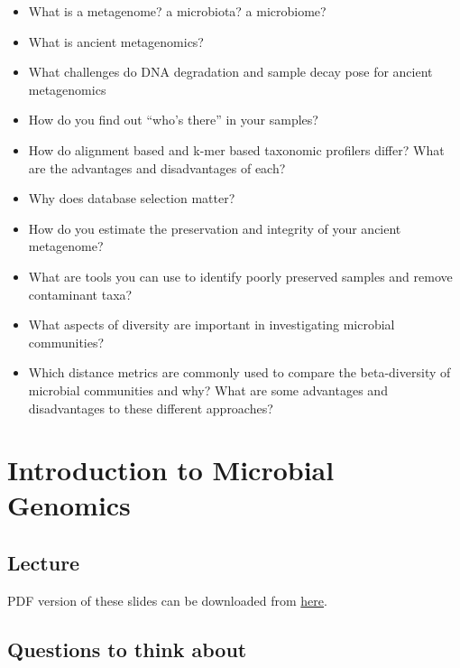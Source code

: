 \documentclass[
  letterpaper,
]{book}
\providecommand{\tightlist}{%
  \setlength{\itemsep}{0pt}\setlength{\parskip}{0pt}}\usepackage{longtable,booktabs,array}
\begin{document}
\begin{itemize}
\tightlist
\item
  What is a metagenome? a microbiota? a microbiome?
\item
  What is ancient metagenomics?
\item
  What challenges do DNA degradation and sample decay pose for ancient
  metagenomics
\item
  How do you find out ``who's there'' in your samples?
\item
  How do alignment based and k-mer based taxonomic profilers differ?
  What are the advantages and disadvantages of each?
\item
  Why does database selection matter?
\item
  How do you estimate the preservation and integrity of your ancient
  metagenome?
\item
  What are tools you can use to identify poorly preserved samples and
  remove contaminant taxa?
\item
  What aspects of diversity are important in investigating microbial
  communities?
\item
  Which distance metrics are commonly used to compare the beta-diversity
  of microbial communities and why? What are some advantages and
  disadvantages to these different approaches?
\end{itemize}

\hypertarget{introduction-to-microbial-genomics-1}{%
\chapter{Introduction to Microbial
Genomics}\label{introduction-to-microbial-genomics-1}}

\hypertarget{lecture-3}{%
\section{Lecture}\label{lecture-3}}

PDF version of these slides can be downloaded from
\href{https://github.com/SPAAM-community/wss-summer-school/raw/main/docs/assets/slides/2022/4a-intro-to-microbial-genomics/SPAAM\%20Summer\%20School\%202022\%20-\%204A\%20-\%20Intro\%20to\%20Microbial\%20Genomics.pdf}{here}.

\hypertarget{questions-to-think-about-3}{%
\section{Questions to think about}\label{questions-to-think-about-3}}
\end{document}
